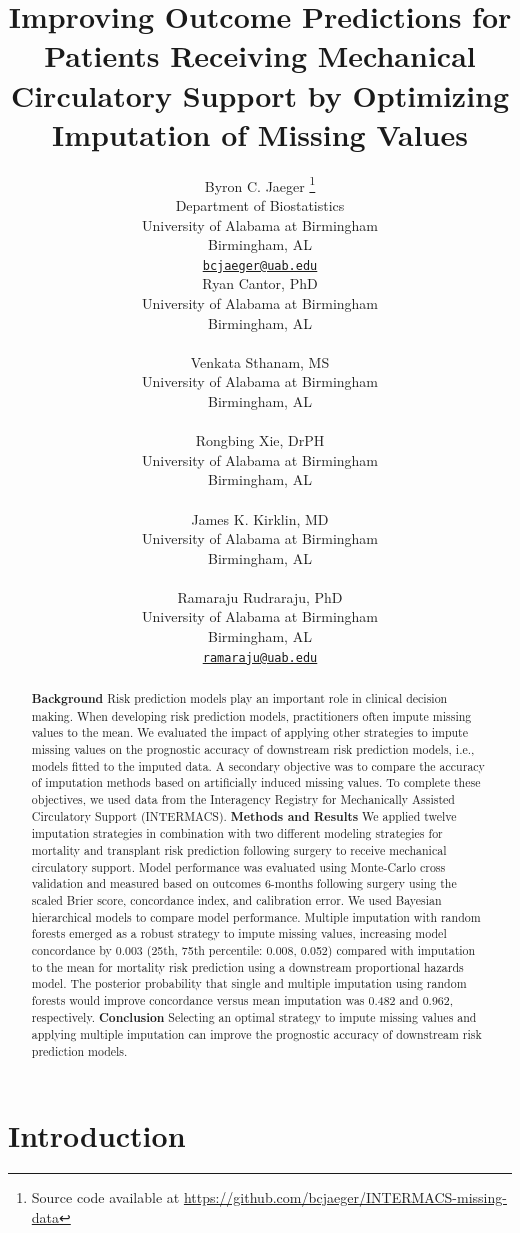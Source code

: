 \documentclass{article}
\title{Improving Outcome Predictions for Patients Receiving Mechanical
Circulatory Support by Optimizing Imputation of Missing Values}
\author{
    Byron C. Jaeger
    \thanks{Source code available at
\url{https://github.com/bcjaeger/INTERMACS-missing-data}}
   \\
    Department of Biostatistics \\
    University of Alabama at Birmingham \\
  Birmingham, AL \\
  \texttt{\href{mailto:bcjaeger@uab.edu}{\nolinkurl{bcjaeger@uab.edu}}} \\
   \And
    Ryan Cantor, PhD
   \\
    University of Alabama at Birmingham \\
  Birmingham, AL \\
  \texttt{} \\
   \And
    Venkata Sthanam, MS
   \\
    University of Alabama at Birmingham \\
  Birmingham, AL \\
  \texttt{} \\
   \And
    Rongbing Xie, DrPH
   \\
    University of Alabama at Birmingham \\
  Birmingham, AL \\
  \texttt{} \\
   \And
    James K. Kirklin, MD
   \\
    University of Alabama at Birmingham \\
  Birmingham, AL \\
  \texttt{} \\
   \And
    Ramaraju Rudraraju, PhD
   \\
    University of Alabama at Birmingham \\
  Birmingham, AL \\
  \texttt{\href{mailto:ramaraju@uab.edu}{\nolinkurl{ramaraju@uab.edu}}} \\
  }
\begin{document}
\maketitle

\def\tightlist{}


\begin{abstract}
\textbf{Background} Risk prediction models play an important role in
clinical decision making. When developing risk prediction models,
practitioners often impute missing values to the mean. We evaluated the
impact of applying other strategies to impute missing values on the
prognostic accuracy of downstream risk prediction models, i.e., models
fitted to the imputed data. A secondary objective was to compare the
accuracy of imputation methods based on artificially induced missing
values. To complete these objectives, we used data from the Interagency
Registry for Mechanically Assisted Circulatory Support (INTERMACS).
\newline\textbf{Methods and Results} We applied twelve imputation
strategies in combination with two different modeling strategies for
mortality and transplant risk prediction following surgery to receive
mechanical circulatory support. Model performance was evaluated using
Monte-Carlo cross validation and measured based on outcomes 6-months
following surgery using the scaled Brier score, concordance index, and
calibration error. We used Bayesian hierarchical models to compare model
performance. Multiple imputation with random forests emerged as a robust
strategy to impute missing values, increasing model concordance by 0.003
(25th, 75th percentile: 0.008, 0.052) compared with imputation to the
mean for mortality risk prediction using a downstream proportional
hazards model. The posterior probability that single and multiple
imputation using random forests would improve concordance versus mean
imputation was 0.482 and 0.962, respectively.
\newline\textbf{Conclusion} Selecting an optimal strategy to impute
missing values and applying multiple imputation can improve the
prognostic accuracy of downstream risk prediction models.
\end{abstract}


\hypertarget{introduction}{%
\section{Introduction}\label{introduction}}
\end{document}
